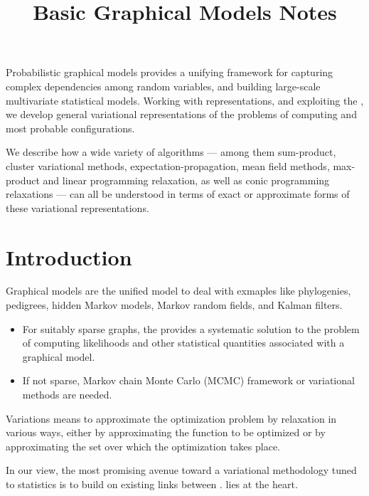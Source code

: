 \documentclass{article}
\title{Basic Graphical Models Notes}
\begin{document}
\maketitle
Probabilistic graphical models provides a unifying framework for capturing complex dependencies among random variables, and building large-scale multivariate statistical models. Working with  representations, and exploiting the , we develop general variational representations of the problems of computing  and most probable conﬁgurations.

We describe how a wide variety of algorithms — among them sum-product, cluster variational methods, expectation-propagation, mean ﬁeld methods, max-product and linear programming relaxation, as well as conic programming relaxations — can all be understood in terms of exact or approximate forms of these variational representations.
\section{Introduction}
Graphical models are the unified  model to deal with exmaples like phylogenies, pedigrees, hidden Markov models, Markov random fields, and Kalman filters. 

\begin{itemize}
    \item For suitably sparse graphs, the  provides a systematic solution to the problem of computing likelihoods and other statistical quantities associated with a graphical model.
    \item If not sparse, Markov chain Monte Carlo (MCMC) framework or variational methods are needed.
\end{itemize}

Variations means to approximate the optimization problem by relaxation in various ways, either by approximating the function to be optimized or by approximating the set over which the optimization takes place. 

In our view, the most promising avenue toward a variational methodology tuned to statistics is to build on existing links between .  lies at the heart.
\end{document}
